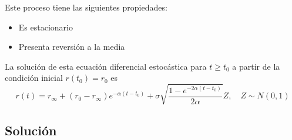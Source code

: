 \documentclass[a4paper]{article}
\begin{document}
Este proceso tiene las siguientes propiedades:
\begin{itemize}
  \item Es estacionario
  \item Presenta reversión a la media
\end{itemize}

La solución de esta ecuación diferencial estocástica para $t \geq t_{0}$ a partir de la condición inicial $r(t_{0}) = r_{0}$ es
\begin{equation}\label{sol:sde}
r(t) = r_{\infty} + (r_{0} - r_{\infty})e^{-\alpha(t-t_{0})} + \sigma \sqrt{\frac{1 - e^{-2\alpha(t-t_{0})}}{2\alpha}}Z, \quad Z \sim N(0,1)
\end{equation}

\subsection*{Solución}
\end{document}
